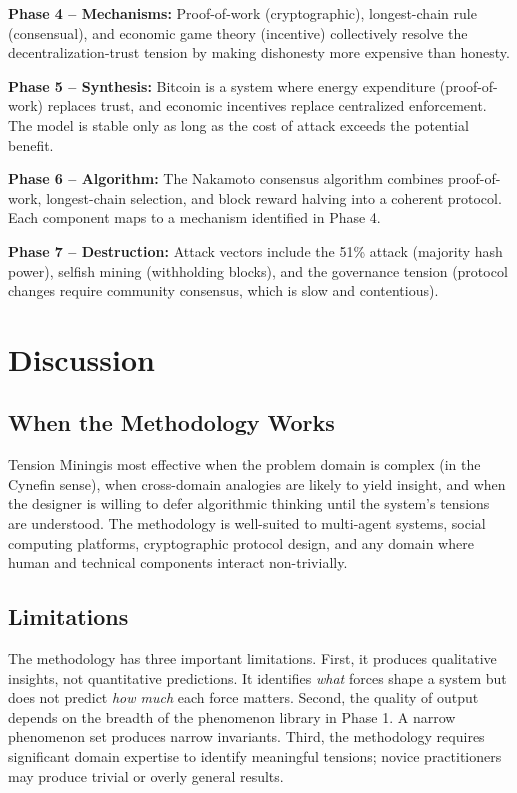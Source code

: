 \documentclass[11pt,a4paper]{article}
\newcommand{\methodname}{Tension Mining}
\begin{document}
\textbf{Phase 4 -- Mechanisms:} Proof-of-work (cryptographic), longest-chain rule (consensual), and economic game theory (incentive) collectively resolve the decentralization-trust tension by making dishonesty more expensive than honesty.

\textbf{Phase 5 -- Synthesis:} Bitcoin is a system where energy expenditure (proof-of-work) replaces trust, and economic incentives replace centralized enforcement. The model is stable only as long as the cost of attack exceeds the potential benefit.

\textbf{Phase 6 -- Algorithm:} The Nakamoto consensus algorithm combines proof-of-work, longest-chain selection, and block reward halving into a coherent protocol. Each component maps to a mechanism identified in Phase 4.

\textbf{Phase 7 -- Destruction:} Attack vectors include the 51\% attack (majority hash power), selfish mining (withholding blocks), and the governance tension (protocol changes require community consensus, which is slow and contentious).

\section{Discussion}
\label{sec:discussion}

\subsection{When the Methodology Works}

\methodname is most effective when the problem domain is complex (in the Cynefin sense), when cross-domain analogies are likely to yield insight, and when the designer is willing to defer algorithmic thinking until the system's tensions are understood. The methodology is well-suited to multi-agent systems, social computing platforms, cryptographic protocol design, and any domain where human and technical components interact non-trivially.

\subsection{Limitations}

The methodology has three important limitations. First, it produces qualitative insights, not quantitative predictions. It identifies \emph{what} forces shape a system but does not predict \emph{how much} each force matters. Second, the quality of output depends on the breadth of the phenomenon library in Phase 1. A narrow phenomenon set produces narrow invariants. Third, the methodology requires significant domain expertise to identify meaningful tensions; novice practitioners may produce trivial or overly general results.
\end{document}
